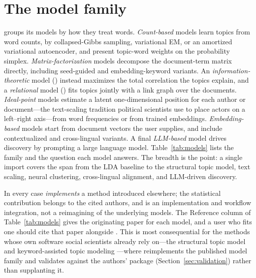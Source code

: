 \documentclass[article]{jss}
\begin{document}
\section{The model family}\label{sec:models}

 groups its models by how they treat words. \emph{Count-based}
models learn topics from word counts, by collapsed-Gibbs sampling, variational
EM, or an amortized variational autoencoder, and present topic-word weights on
the probability simplex. \emph{Matrix-factorization} models decompose the
document-term matrix directly, including seed-guided and embedding-keyword
variants. An \emph{information-theoretic} model () instead maximizes
the total correlation the topics explain, and a \emph{relational} model
() fits topics jointly with a link graph over the documents.
\emph{Ideal-point} models estimate a latent one-dimensional position for each
author or document---the text-scaling tradition political scientists use to place
actors on a left--right axis---from word frequencies or from trained embeddings.
\emph{Embedding-based} models start from document vectors the user supplies, and
include contextualized and cross-lingual variants. A final \emph{LLM-based} model
drives discovery by prompting a large language model. Table~\ref{tab:models} lists
the family and the question each
model answers. The breadth is the point: a single import covers the span from the
LDA baseline to the structural topic model, text scaling, neural clustering,
cross-lingual alignment, and LLM-driven discovery.

In every case  \emph{implements} a method introduced elsewhere; the
statistical contribution belongs to the cited authors, and  is an
implementation and workflow integration, not a reimagining of the underlying
models. The Reference column of Table~\ref{tab:models} gives the originating
paper for each model, and a user who fits one should cite that paper alongside
 \citep{caren2026topica}. This is most consequential for the methods
whose own software social scientists already rely on---the structural topic model
\citep{roberts2016model} and keyword-assisted topic modeling
\citep{eshima2024keyatm}---where  reimplements the published model
family and validates against the authors' package (Section~\ref{sec:validation})
rather than supplanting it.
\end{document}
